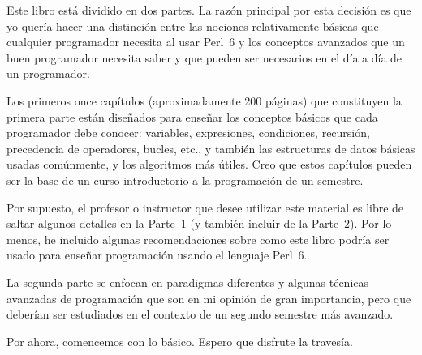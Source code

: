%

Este libro está dividido en dos partes. La razón principal 
por esta decisión es que yo quería hacer una distinción entre 
las nociones relativamente básicas que cualquier programador necesita 
al usar Perl~6 y los conceptos avanzados que un buen programador
necesita saber y que pueden ser necesarios en el día a día de un programador.

Los primeros once capítulos (aproximadamente 200 páginas) 
que constituyen la primera parte están diseñados para enseñar los
conceptos básicos que cada programador debe conocer: variables,
expresiones, condiciones, recursión, precedencia de operadores, bucles,
etc., y también las estructuras de datos básicas usadas comúnmente, 
y los algoritmos más útiles. Creo que estos capítulos pueden
ser la base de un curso introductorio a la programación
de un semestre.
 
Por supuesto, el profesor o instructor que desee utilizar este material
es libre de saltar algunos detalles en la Parte~1 (y también incluir 
de la Parte~2). Por lo menos, he incluido algunas recomendaciones
sobre como este libro podría ser usado para enseñar programación
usando el lenguaje Perl~6.

La segunda parte se enfocan en paradigmas diferentes y algunas
técnicas avanzadas de programación que son en mi opinión de gran
importancia, pero que deberían ser estudiados en el contexto
de un segundo semestre más avanzado.

Por ahora, comencemos con lo básico. Espero que disfrute la travesía.

